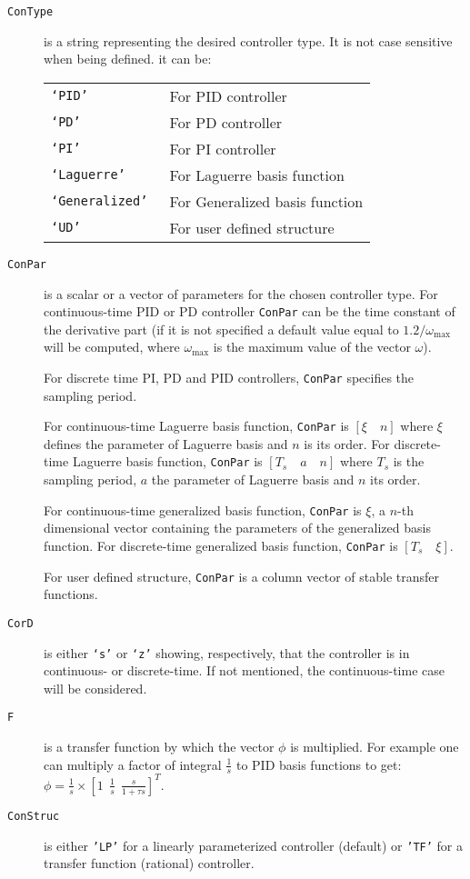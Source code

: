 \documentclass [12pt , a4paper] {report}
\begin{document}
\begin{description}
\item[\texttt{ConType}] is a string representing the desired controller type. It is not case sensitive when being defined. it can be:

  \begin{tabular}{ll}
       {\tt `PID'}     &    For PID controller \\
      {\tt `PD' }       & For PD controller\\
       {\tt `PI' }        &  For PI controller\\
      {\tt  `Laguerre' }  &  For Laguerre basis function\\
      {\tt  `Generalized' }  & For Generalized basis function\\
    {\tt `UD'}        &   For user defined structure 
\end{tabular}

\item[\texttt{ConPar}]  is a scalar or a vector of parameters for the chosen controller type.
For continuous-time PID or PD controller {\tt ConPar} can be the time constant
       of the derivative part (if it is not specified a default value equal to $1.2/\omega_{\max}$ will be computed, where $\omega_{\max}$ is the maximum value of the vector $\omega$).

For discrete time PI, PD and PID controllers, {\tt ConPar} specifies the sampling period.

For continuous-time  Laguerre basis function, {\tt ConPar} is $[\xi \quad n]$ where $\xi$ defines the parameter of 
       Laguerre basis and $n$ is its order. For discrete-time Laguerre basis function, {\tt ConPar} is 
       $[T_s \quad a \quad n]$ where $T_s$ is the sampling period, $a$ the parameter of Laguerre basis and $n$ its order.
       
       For continuous-time generalized basis function, {\tt ConPar} is $\xi$, a $n$-th
       dimensional vector containing the parameters of the generalized basis
       function. For discrete-time generalized basis function, {\tt ConPar} is
       $[T_s \quad \xi]$.

       For user defined structure, {\tt ConPar} is a column vector of stable
       transfer functions.

\item[\texttt{CorD}] is either \texttt{`s'} or \texttt{`z'} showing, respectively, that the controller is in continuous- or discrete-time. If not mentioned, the continuous-time case will be considered. 

\item[\texttt{F}] is a transfer function by which the vector $\phi$ is multiplied. For example one can multiply a factor of integral $\frac{1}{s}$ to PID basis functions to get: $\phi=\frac{1}{s} \times [1\:\: \frac{1}{s} \:\: \frac{s}{1+\tau s}]^T$.

\item[\texttt{ConStruc}] is either \texttt{'LP'} for a linearly parameterized controller (default) or \texttt{'TF'} for a transfer function (rational) controller.

    

\end{description}
\end{document}
